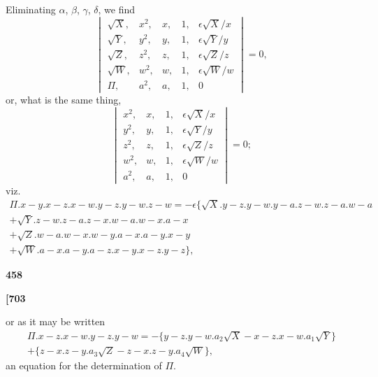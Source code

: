 \documentclass[12pt,a4paper]{article}
\theoremstyle{definition}
\begin{document}
Eliminating $\alpha$, $\beta$, $\gamma$, $\delta$, we find
\[
\begin{vmatrix}
\sqrt{X}, & x^2, & x, & 1, & \epsilon\sqrt{X}/x \\
\sqrt{Y}, & y^2, & y, & 1, & \epsilon\sqrt{Y}/y \\
\sqrt{Z}, & z^2, & z, & 1, & \epsilon\sqrt{Z}/z \\
\sqrt{W}, & w^2, & w, & 1, & \epsilon\sqrt{W}/w \\
\Pi, & a^2, & a, & 1, & 0
\end{vmatrix} = 0,
\]
or, what is the same thing,
\[
\begin{vmatrix}
x^2, & x, & 1, & \epsilon\sqrt{X}/x \\
y^2, & y, & 1, & \epsilon\sqrt{Y}/y \\
z^2, & z, & 1, & \epsilon\sqrt{Z}/z \\
w^2, & w, & 1, & \epsilon\sqrt{W}/w \\
a^2, & a, & 1, & 0
\end{vmatrix} = 0;
\]
viz.
\begin{multline*}
\Pi . x - y . x - z . x - w . y - z . y - w . z - w = -\epsilon \{\sqrt{X}.y - z.y - w.y - a.z - w.z - a.w - a \\
+ \sqrt{Y}.z - w.z - a.z - x.w - a.w - x.a - x \\
+ \sqrt{Z}.w - a.w - x.w - y.a - x.a - y.x - y \\
+ \sqrt{W}.a - x.a - y.a - z.x - y.x - z.y - z\},
\end{multline*}

\vspace{1em}

\begin{center}
\textbf{458}
\end{center}

\vspace{0.5em}

\noindent\textbf{[703}

\vspace{0.5em}

or as it may be written
\begin{multline*}
\Pi . x - z . x - w . y - z . y - w = -\{y - z . y - w . a_2 \sqrt{X} - x - z . x - w . a_1 \sqrt{Y}\} \\
+ \{z - x . z - y . a_3 \sqrt{Z} - z - x . z - y . a_4 \sqrt{W}\},
\end{multline*}
an equation for the determination of $\Pi$.
\end{document}
